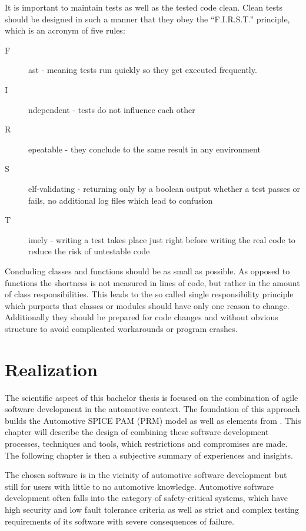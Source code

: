It is important to maintain tests as well as the tested code clean. Clean tests should be designed in such a manner that they obey the “F.I.R.S.T.” principle, 
which is an acronym of five rules:

\begin{description}
 \item [F]ast - meaning tests run quickly so they get executed frequently.
 \item [I]ndependent - tests do not influence each other
 \item [R]epeatable - they conclude to the same result in any environment
 \item [S]elf-validating - returning only by a boolean output whether a test passes or fails, no additional log files which lead to confusion
 \item [T]imely - writing a test takes place just right before writing the real code to reduce the risk of untestable code
\end{description}

Concluding classes and functions should be as small as possible. As opposed to functions the shortness is not measured in lines of code, but 
rather in the amount of class responsibilities. This leads to the so called single responsibility principle which purports that classes or modules 
should have only one reason to change. Additionally they should be prepared for code changes and without obvious structure to avoid complicated workarounds
or program crashes.

\section{Realization}

The scientific aspect of this bachelor thesis is focused on the combination of agile software development in the automotive context. The 
foundation of this approach builds the Automotive SPICE PAM (PRM) model as well as elements from \citeauthor{BECK} . 
This chapter will describe the design of combining these software development processes, techniques and tools, which restrictions  
and compromises are made. The following chapter  is then a subjective summary of experiences and insights.

The chosen software is in the vicinity of automotive software development but still for users with little to no automotive knowledge. 
Automotive software development often falls into the category of safety-critical systems, which have high 
security and low fault tolerance criteria as well as strict and complex testing requirements of its software with severe consequences of failure.

